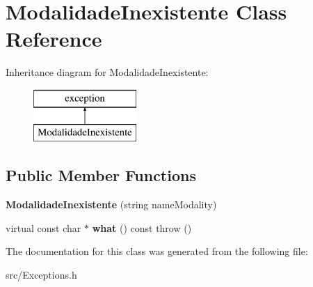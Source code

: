 \hypertarget{class_modalidade_inexistente}{}\section{Modalidade\+Inexistente Class Reference}
\label{class_modalidade_inexistente}
Inheritance diagram for Modalidade\+Inexistente\+:\begin{figure}[H]
\begin{center}
\leavevmode
\includegraphics[height=2.000000cm]{class_modalidade_inexistente}
\end{center}
\end{figure}
\subsection*{Public Member Functions}
\begin{DoxyCompactItemize}
\item 
\hypertarget{class_modalidade_inexistente_a3eeb1f2c1dae3993ae73a016bf5119d5}{}{\bfseries Modalidade\+Inexistente} (string name\+Modality)\label{class_modalidade_inexistente_a3eeb1f2c1dae3993ae73a016bf5119d5}

\item 
\hypertarget{class_modalidade_inexistente_ac1bdf97f896db92ee136e17d38b50a9d}{}virtual const char $\ast$ {\bfseries what} () const   throw ()\label{class_modalidade_inexistente_ac1bdf97f896db92ee136e17d38b50a9d}

\end{DoxyCompactItemize}


The documentation for this class was generated from the following file\+:\begin{DoxyCompactItemize}
\item 
src/Exceptions.\+h\end{DoxyCompactItemize}
